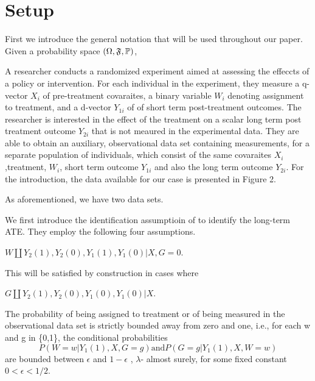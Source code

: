 \documentclass{article}
\begin{document}
\section{Setup}

First we introduce the general notation that will be used throughout our paper.
Given a probability space $(\Omega,\mathfrak{F},\mathbb{P})$, \todo

A researcher conducts a randomized experiment aimed at assessing the effeccts of a policy or intervention. For each individual in the experiment, they measure a q-vector $X_i$ of pre-treatment covaraites, a binary variable $W_i$ denoting assignment to treatment, and a d-vector $Y_{1i}$ of of short term post-treatment outcomes. The researcher is interested in the effect of the treatment on a scalar long term post treatment outcome $Y_{2i} $ that is not meaured in the experimental data. They are able to obtain an auxiliary, observational data set containing measurements, for a separate population of individuals, which consist of the same covaraites $X_i $,treatment, $W_i$, short term outcome $Y_{1i} $ and also the long term outcome $Y_{2i}$. 
For the introduction, the data available for our case is presented in Figure 2. 


As aforementioned, we have two data sets. 

We first introduce the identification assumptioin of \cite{athey2020combining} to identify the long-term ATE. They employ the following four assumptions.
\cite{athey2020combining} 
\begin{assumption}\label{ass: exp1}
    $W \amalg Y_2(1), Y_2(0), Y_1(1), Y_1(0) | X, G=0$.
\end{assumption}

This will be satisfied by construction in cases where 

\begin{assumption}\label{ass: ex1}
    $G \amalg Y_2(1), Y_2(0), Y_1(0), Y_1(0) | X$.
\end{assumption}

\begin{assumption}
    The probability of being assigned to treatment or of being measured in the observational data set is strictly bounded away from zero and one, i.e., for each w and g in \{0,1\}, the conditional probabilities 
    \begin{equation}
        P(W = w | Y_1(1), X, G = g ) \text{and} P(G=g | Y_1(1), X, W = w) 
    \end{equation}
    are bounded between $\epsilon $ and $ 1 - \epsilon $ , $ \lambda$- almost surely, for some fixed constant $ 0 < \epsilon < 1/2 $.
\end{assumption}
\end{document}
